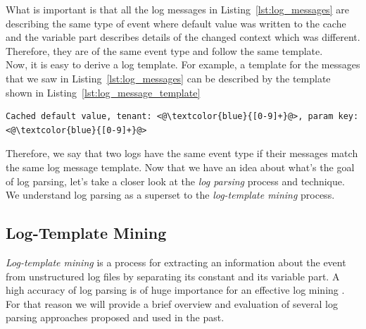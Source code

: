 What is important is that all the log messages in Listing~\ref{lst:log_messages} are describing the same type of event where default value was written to the cache and the variable part describes details of the changed context which was different. Therefore, they are of the same event type and follow the same template. \\

Now, it is easy to derive a log template. For example, a template for the messages that we saw in Listing~\ref{lst:log_messages} can be described by the template shown in Listing~\ref{lst:log_message_template}\\

\begin{lstlisting}[label={lst:log_message_template}, caption={Template for log messages in Listing ~\ref{lst:log_messages}, regular expressions are denoted in blue.}, captionpos=b]
Cached default value, tenant: <@\textcolor{blue}{[0-9]+}@>, param key: <@\textcolor{blue}{[0-9]+}@> 
\end{lstlisting}

Therefore, we say that two logs have the same event type if their messages match the same log message template. Now that we have an idea about what's the goal of log parsing, let's take a closer look at the \textit{log parsing} process and technique. We understand log parsing as a superset to the \textit{log-template mining} process. \\

\subsection{Log-Template Mining}\label{log_template_mining}

\textit{Log-template mining} is a process for extracting an information about the event from unstructured log files by separating its constant and its variable part. A high accuracy of log parsing is of huge importance for an effective log mining \cite{logParsingEvaluation2016}. For that reason we will provide a brief overview and evaluation of several log parsing approaches proposed and used in the past. \\
    
